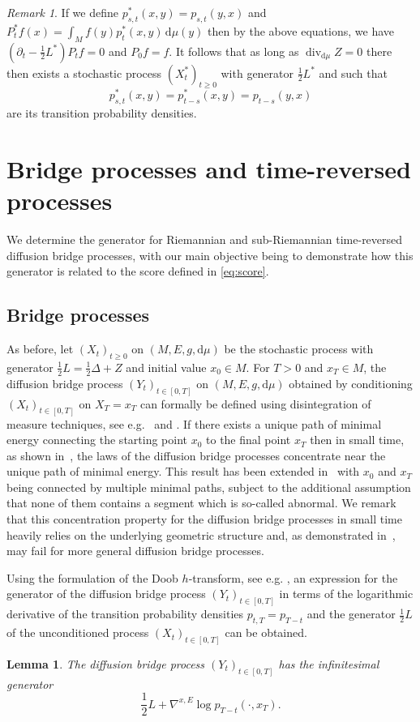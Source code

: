 \documentclass[10pt]{amsart}
\newcounter{dummy} \numberwithin{dummy}{section}
\newtheorem{lemma}[dummy]{Lemma}
\theoremstyle{remark}
\newtheorem{remark}[dummy]{Remark}
\DeclareMathOperator{\dv}{div}
\newcommand{\dd}{\,{\mathrm d}}
\newcommand{\db}{{\mathrm d}}
\numberwithin{equation}{section}
\begin{document}
\begin{remark}\label{remark:adjointprocess}
If we define $p_{s,t}^*(x,y) = p_{s,t}(y,x)$ and $P_{t}^*f(x) = \int_M f(y) p_{t}^*(x,y)\dd\mu(y)$ then by the above equations, we have $(\partial_t - \frac{1}{2}L^*) P_t f =0$ and $P_0 f = f$. It follows that as long as $\dv_{\db\mu} Z =0$ there then exists a stochastic process $(X_t^*)_{t\geq 0}$ with generator $\frac{1}{2} L^*$ and such that
$$p_{s,t}^*(x,y) = p_{t-s}^*(x,y) = p_{t-s}(y,x)$$
are its transition probability densities.
\end{remark}

\section{Bridge processes and time-reversed processes }
\label{sec:bridge}
We determine the generator for Riemannian and sub-Riemannian time-reversed diffusion bridge processes, with our main objective being to demonstrate how this generator is related to the score defined in \eqref{eq:score}.

\subsection{Bridge processes}
As before, let $(X_t)_{t\geq 0}$ on $(M,E,g,\db\mu)$ be the stochastic process with generator $\frac{1}{2}L=\frac{1}{2}\Delta +Z$ and initial value $x_0\in M$. For $T>0$ and $x_T\in M$, the diffusion bridge process $(Y_t)_{t\in[0,T]}$ on $(M,E,g,\db\mu)$ obtained by conditioning $(X_t)_{t\in[0,T]}$ on $X_T=x_T$ can formally be defined using disintegration of measure techniques, see e.g.~\cite{BMN21} and \cite{Hab18}. If there exists a unique path of minimal energy connecting the starting point $x_0$ to the final point $x_T$ then in small time, as shown in~\cite{BN22}, the laws of the diffusion bridge processes concentrate near the unique path of minimal energy. This result has been extended in~\cite{neel2020uniform} with $x_0$ and $x_T$ being connected by multiple minimal paths, subject to the additional assumption that none of them contains a segment which is so-called abnormal. We remark that this concentration property for the diffusion bridge processes in small time heavily relies on the underlying geometric structure and, as demonstrated in~\cite{Hab19}, may fail for more general diffusion bridge processes.

Using the formulation of the Doob $h$-transform, see e.g. \cite[Chapter~7.5]{sarkka2019applied}, an expression for the generator of the diffusion bridge process $(Y_t)_{t\in[0,T]}$ in terms of the logarithmic derivative of the transition probability densities $p_{t,T} = p_{T-t}$ and the generator $\frac{1}{2}L$ of the unconditioned process $(X_t)_{t\in[0,T]}$ can be obtained.
\begin{lemma} \label{lemma:Bridge}
The diffusion bridge process $(Y_t)_{t\in[0,T]}$ has the infinitesimal generator 
$$\frac{1}{2} L + \nabla^{x,E} \log p_{T-t}(\cdot , x_T).$$
\end{lemma}
\end{document}
